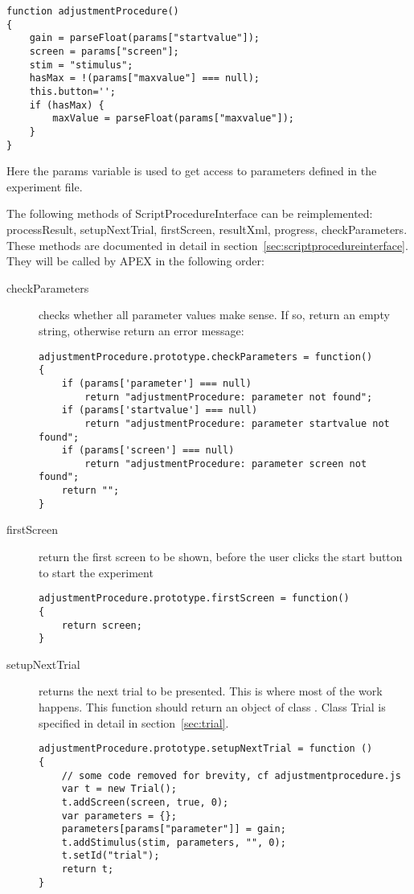 \begin{lstlisting}
function adjustmentProcedure()
{
    gain = parseFloat(params["startvalue"]);
    screen = params["screen"];
    stim = "stimulus";
    hasMax = !(params["maxvalue"] === null);
    this.button='';
    if (hasMax) {
        maxValue = parseFloat(params["maxvalue"]);
    }
}
\end{lstlisting}

Here the params variable is used to get access to parameters defined in the experiment file.

The following methods of ScriptProcedureInterface can be reimplemented: processResult, setupNextTrial, firstScreen, resultXml, progress, checkParameters. These methods are documented in detail in section~\ref{sec:scriptprocedureinterface}. They will be called by APEX in the following order:
\begin{description}
\item[checkParameters] checks whether all parameter values make sense. If so, return an empty string, otherwise return an error message:
\begin{lstlisting}
adjustmentProcedure.prototype.checkParameters = function()
{
    if (params['parameter'] === null)
        return "adjustmentProcedure: parameter not found";
    if (params['startvalue'] === null)
        return "adjustmentProcedure: parameter startvalue not found";
    if (params['screen'] === null)
        return "adjustmentProcedure: parameter screen not found";
    return "";
}
\end{lstlisting}
\item[firstScreen] return the first screen to be shown, before the user clicks the start button to start the experiment
\begin{lstlisting}
adjustmentProcedure.prototype.firstScreen = function()
{
    return screen;
}
\end{lstlisting}
\item[setupNextTrial] returns the next trial to be presented. This is where most of the work happens. This function should return an object of class . Class Trial is specified in detail in section~\ref{sec:trial}.
\begin{lstlisting}
adjustmentProcedure.prototype.setupNextTrial = function ()
{
	// some code removed for brevity, cf adjustmentprocedure.js
    var t = new Trial();
    t.addScreen(screen, true, 0);
    var parameters = {};
    parameters[params["parameter"]] = gain;
    t.addStimulus(stim, parameters, "", 0);
    t.setId("trial");
    return t;
}
\end{lstlisting}


\end{description}
